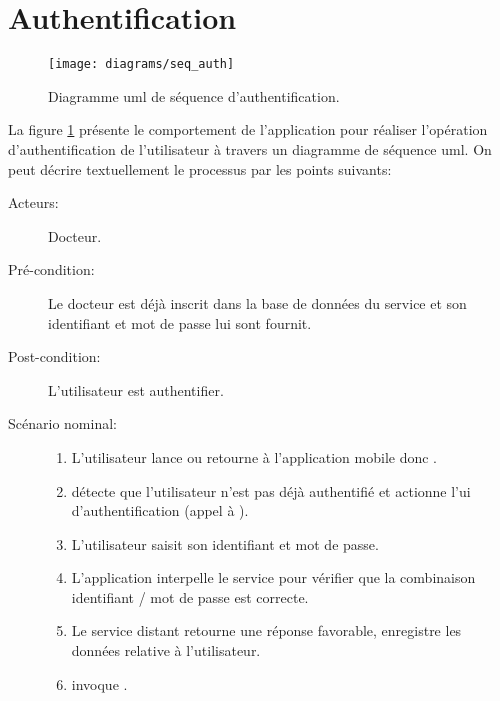 \section{Authentification}

\begin{figure}
\center
\texttt{[image: diagrams/seq\_auth]}
\caption{Diagramme \gls{uml} de séquence d'authentification.}
\label{fig:seq_auth}
\end{figure}

La figure \ref{fig:seq_auth} présente le comportement de l'application pour réaliser l'opération d'authentification de l'utilisateur à travers un diagramme de séquence \gls{uml}. On peut décrire textuellement le processus par les points suivants:

\begin{description}

\item[Acteurs:] Docteur.

\item[Pré-condition:] Le docteur est déjà inscrit dans la base de données du service et son identifiant et mot de passe lui sont fournit.

\item[Post-condition:] L'utilisateur est authentifier.

\item[Scénario nominal:]

\begin{enumerate}

\item L'utilisateur lance ou retourne à l'application mobile donc .

\item {} détecte que l'utilisateur n'est pas déjà authentifié et actionne l'\gls{ui} d'authentification (appel à ).

\item L'utilisateur saisit son identifiant et mot de passe.

\item L'application interpelle le service pour vérifier que la combinaison identifiant / mot de passe est correcte.

\item Le service distant retourne une réponse favorable,  enregistre les données relative à l'utilisateur.

\item {} invoque .


\end{enumerate}
\end{description}
